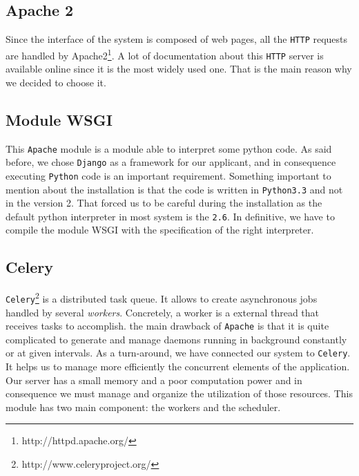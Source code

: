 \subsection{Apache 2}
Since the interface of the system is composed of web pages, all the \texttt{HTTP} requests are handled by Apache2\footnote{http://httpd.apache.org/}. A lot of documentation about this \texttt{HTTP} server is available online since it is the most widely used one. That is the main reason why we decided to choose it.

\subsection{Module WSGI}
This \texttt{Apache} module is a module able to interpret some python code. As said before, we chose \texttt{Django} as a framework for our applicant, and in consequence executing \texttt{Python} code is an important requirement. Something important to mention about the installation is that the code is written in \texttt{Python3.3} and not in the version 2. That forced us to be careful during the installation as the default python interpreter in most system is the \texttt{2.6}. In definitive, we have to compile the module WSGI with the specification of the right interpreter.

\subsection{Celery}
\texttt{Celery}\footnote{http://www.celeryproject.org/} is a distributed task queue. It allows to create asynchronous jobs handled by several \emph{workers}. Concretely, a worker is a external thread that receives tasks to accomplish. the main drawback of \texttt{Apache} is that it is quite complicated to generate and manage daemons running in background constantly or at given intervals. As a turn-around, we have connected our system to \texttt{Celery}. It helps us to manage more efficiently the concurrent elements of the application. Our server has a small memory and a poor computation power and in consequence we must manage and organize the utilization of those resources. This module has two main component: the workers and the scheduler.

